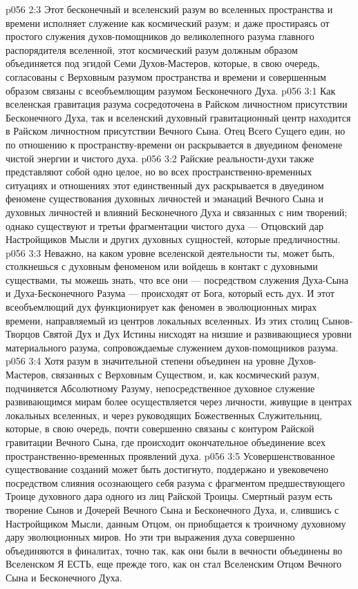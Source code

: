 \vs p056 2:3 Этот бесконечный и вселенский разум во вселенных пространства и времени исполняет служение как космический разум; и даже простираясь от простого служения духов\hyp{}помощников до великолепного разума главного распорядителя вселенной, этот космический разум должным образом объединяется под эгидой Семи Духов\hyp{}Мастеров, которые, в свою очередь, согласованы с Верховным разумом пространства и времени и совершенным образом связаны с всеобъемлющим разумом Бесконечного Духа.
\vs p056 3:1 Как вселенская гравитация разума сосредоточена в Райском личностном присутствии Бесконечного Духа, так и вселенский духовный гравитационный центр находится в Райском личностном присутствии Вечного Сына. Отец Всего Сущего един, но по отношению к пространству\hyp{}времени он раскрывается в двуедином феномене чистой энергии и чистого духа.
\vs p056 3:2 Райские реальности\hyp{}духи также представляют собой одно целое, но во всех пространственно\hyp{}временных ситуациях и отношениях этот единственный дух раскрывается в двуедином феномене существования духовных личностей и эманаций Вечного Сына и духовных личностей и влияний Бесконечного Духа и связанных с ним творений; однако существуют и третьи фрагментации чистого духа --- Отцовский дар Настройщиков Мысли и других духовных сущностей, которые предличностны.
\vs p056 3:3 \pc Неважно, на каком уровне вселенской деятельности ты, может быть, столкнешься с духовным феноменом или войдешь в контакт с духовными существами, ты можешь знать, что все они --- посредством служения Духа\hyp{}Сына и Духа\hyp{}Бесконечного Разума --- происходят от Бога, который есть дух. И этот всеобъемлющий дух функционирует как феномен в эволюционных мирах времени, направляемый из центров локальных вселенных. Из этих столиц Сынов\hyp{}Творцов Святой Дух и Дух Истины нисходят на низшие и развивающиеся уровни материального разума, сопровождаемые служением духов\hyp{}помощников разума.
\vs p056 3:4 Хотя разум в значительной степени объединен на уровне Духов\hyp{}Мастеров, связанных с Верховным Существом, и, как космический разум, подчиняется Абсолютному Разуму, непосредственное духовное служение развивающимся мирам более осуществляется через личности, живущие в центрах локальных вселенных, и через руководящих Божественных Служительниц, которые, в свою очередь, почти совершенно связаны с контуром Райской гравитации Вечного Сына, где происходит окончательное объединение всех пространственно\hyp{}временных проявлений духа.
\vs p056 3:5 \pc Усовершенствованное существование созданий может быть достигнуто, поддержано и увековечено посредством слияния осознающего себя разума с фрагментом предшествующего Троице духовного дара одного из лиц Райской Троицы. Смертный разум есть творение Сынов и Дочерей Вечного Сына и Бесконечного Духа, и, слившись с Настройщиком Мысли, данным Отцом, он приобщается к троичному духовному дару эволюционных миров. Но эти три выражения духа совершенно объединяются в финалитах, точно так, как они были в вечности объединены во Вселенском Я ЕСТЬ, еще прежде того, как он стал Вселенским Отцом Вечного Сына и Бесконечного Духа.
